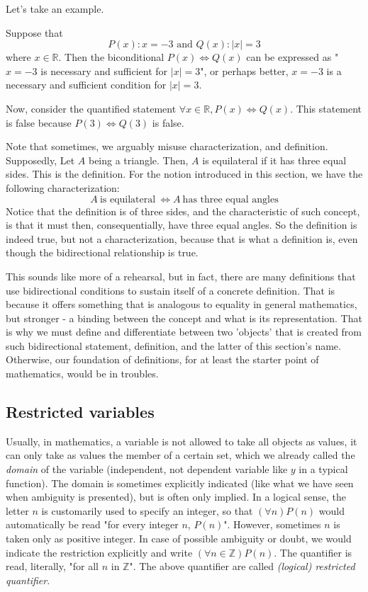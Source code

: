 Let's take an example. 

\begin{example}
    Suppose that 
    \[P(x): x= -3 \text{ and } Q(x): | x| = 3\] where $x\in \mathbb{R}$. Then the biconditional $P(x)\iff Q(x)$ can be expressed as "$x=-3$ is necessary and sufficient for $|x|=3$", or perhaps better, $x=-3$ is a necessary and sufficient condition for $|x|=3$. 

    Now, consider the quantified statement $\forall x\in \mathbb{R}, P(x)\iff Q(x)$. This statement is false because $P(3)\iff Q(3)$ is false. 
\end{example}

Note that sometimes, we arguably misuse characterization, and definition. Supposedly, Let $A$ being a triangle. Then, $A$ is equilateral if it has three equal sides. This is the definition. For the notion introduced in this section, we have the following characterization: 
\begin{equation*}
    A \: \text{is equilateral} \: \iff A \: \text{has three equal angles}
\end{equation*}
Notice that the definition is of three sides, and the characteristic of such concept, is that it must then, consequentially, have three equal angles. So the definition is indeed true, but not a characterization, because that is what a definition is, even though the bidirectional relationship is true. 

This sounds like more of a rehearsal, but in fact, there are many definitions that use bidirectional conditions to sustain itself of a concrete definition. That is because it offers something that is analogous to equality in general mathematics, but stronger - a binding between the concept and what is its representation. That is why we must define and differentiate between two 'objects' that is created from such bidirectional statement, definition, and the latter of this section's name. Otherwise, our foundation of definitions, for at least the starter point of mathematics, would be in troubles. 

\subsection{Restricted variables}

Usually, in mathematics, a variable is not allowed to take all objects as values, it can only take as values the member of a certain set, which we already called the \textit{domain} of the variable (independent, not dependent variable like $y$ in a typical function). The domain is sometimes explicitly indicated (like what we have seen when ambiguity is presented), but is often only implied. In a logical sense, the letter $n$ is customarily used to specify an integer, so that $(\forall n)P(n)$ would automatically be read "for every integer $n$, $P(n)$". However, sometimes $n$ is taken only as positive integer. In case of possible ambiguity or doubt, we would indicate the restriction explicitly and write $(\forall n \in \mathbb{Z})P(n)$. The quantifier is read, literally, "for all $n$ in $\mathbb{Z}$". The above quantifier are called \textit{(logical) restricted quantifier}. 

